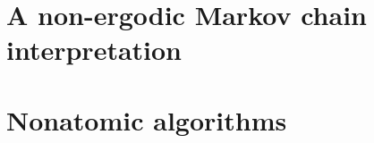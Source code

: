\documentclass{article}
\begin{document}


\section{A non-ergodic Markov chain interpretation}
\label{sec:markov}



\section{Nonatomic algorithms}
\label{sec:nonatomic}
\end{document}
